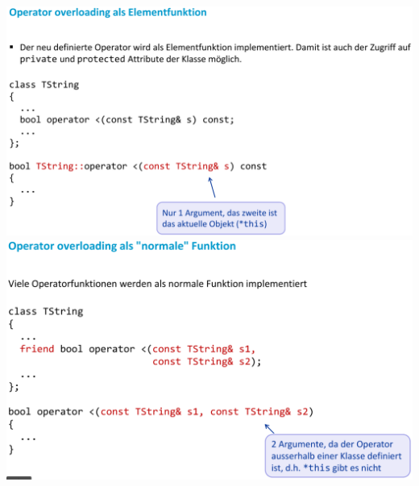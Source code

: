 \begin{multicols}{2}
	\includegraphics[width=\linewidth]{images/operatorOverloading.png}
	\columnbreak
	\includegraphics[width=\linewidth]{images/operatorOverloadingNormaleFunktion.png}
\end{multicols}

